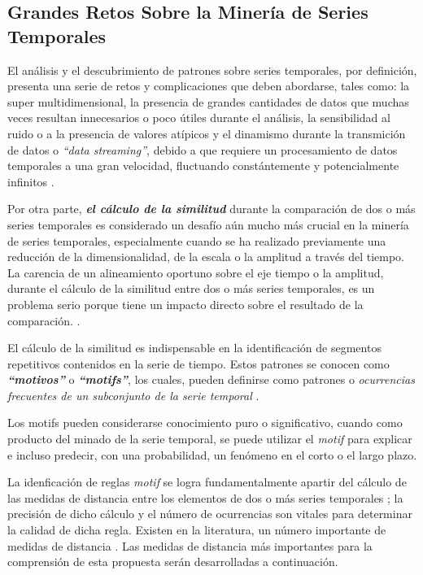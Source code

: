\subsection{Grandes Retos Sobre la Miner\'ia de Series Temporales}
El an\'alisis y el descubrimiento de patrones sobre series temporales, por definici\'on, presenta una serie de retos y complicaciones que deben abordarse, tales como: la super multidimensional, la presencia de grandes cantidades de datos que muchas veces resultan innecesarios o poco \'utiles durante el an\'alisis, la sensibilidad al ruido o a la presencia de valores at\'ipicos y el dinamismo durante la transmici\'on de datos o \textit{\enquote{data streaming}}, debido a que requiere un procesamiento de datos temporales a una gran velocidad, fluctuando const\'antemente y potencialmente infinitos \cite{main}.\par
Por otra parte, \textit{\textbf{el c\'alculo de la similitud}} durante la comparaci\'on de dos o m\'as series temporales es considerado un desaf\'io a\'un mucho m\'as crucial en la miner\'ia de series temporales, especialmente cuando se ha realizado previamente una reducci\'on de la dimensionalidad, de la escala o la amplitud a trav\'es del tiempo. La carencia de un alineamiento oportuno sobre el eje tiempo o la amplitud, durante el c\'alculo de la similitud entre dos o m\'as series temporales, es un problema serio porque tiene un impacto directo sobre el resultado de la comparaci\'on. \cite{concepts}.\par
El c\'alculo de la similitud es indispensable en la identificaci\'on de segmentos repetitivos contenidos en la serie de tiempo. Estos patrones se conocen como \textit{\textbf{\enquote{motivos}}} o \textit{\textbf{\enquote{motifs}}}, los cuales, pueden definirse como patrones o \textit{ocurrencias frecuentes de un subconjunto de la serie temporal} \cite{main}.\par
Los motifs pueden considerarse conocimiento puro o significativo, cuando como producto del minado de la serie temporal, se puede utilizar el \textit{motif} para explicar e incluso predecir, con una probabilidad, un fen\'omeno en el corto o el largo plazo.\par
La idenficaci\'on de reglas \textit{motif} se logra fundamentalmente apartir del c\'alculo de las medidas de distancia entre los elementos de dos o m\'as series temporales \cite{main}; la precisi\'on de dicho c\'alculo y el n\'umero de ocurrencias son vitales para determinar la calidad de dicha regla. Existen en la literatura, un n\'umero importante de medidas de distancia \cite{distancecomparison}. Las medidas de distancia m\'as importantes para la comprensi\'on de esta propuesta ser\'an desarrolladas a continuaci\'on.
